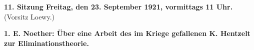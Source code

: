 \begin{center}
\textbf{11. Sitzung Freitag, den 23. September 1921, vormittags 11 Uhr.}\\
(Vorsitz Loewy.)
\end{center}

\begin{center}
\textbf{1. E. Noether: Über eine Arbeit des im Kriege gefallenen K. Hentzelt zur Eliminationstheorie.}
\end{center}
